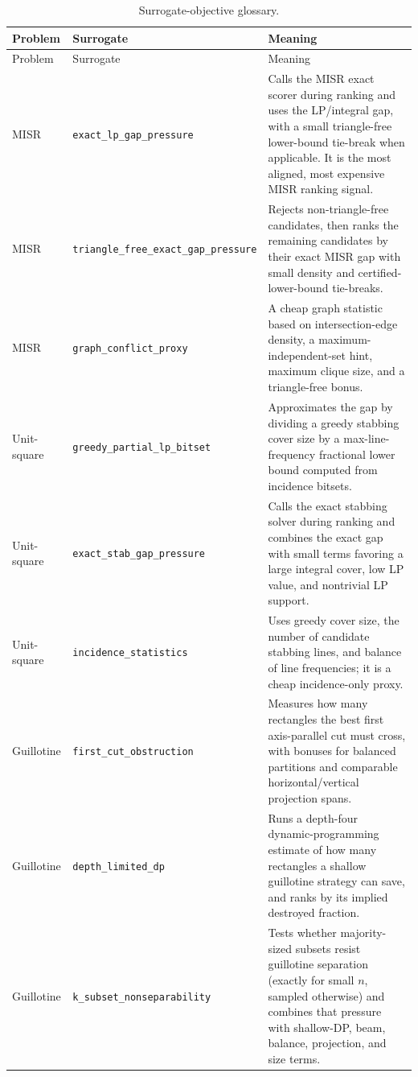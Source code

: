 \documentclass[11pt]{article}
\newcommand{\code}[1]{\texttt{#1}}
\begin{document}
\begin{longtable}{@{}p{}p{}p{}@{}}
\caption{Surrogate-objective glossary.}\label{tab:surrogate-glossary}\\
\toprule
Problem & Surrogate & Meaning \\
\midrule
\endfirsthead
\toprule
Problem & Surrogate & Meaning \\
\midrule
\endhead
\bottomrule
\endfoot
MISR & \code{exact\_lp\_gap\_pressure} & Calls the MISR exact scorer during
ranking and uses the LP/integral gap, with a small triangle-free lower-bound
tie-break when applicable.  It is the most aligned, most expensive MISR
ranking signal. \\
MISR & \code{triangle\_\allowbreak{}free\_\allowbreak{}exact\_\allowbreak{}gap\_\allowbreak{}pressure} & Rejects non-triangle-free
candidates, then ranks the remaining candidates by their exact MISR gap with
small density and certified-lower-bound tie-breaks. \\
MISR & \code{graph\_conflict\_proxy} & A cheap graph statistic based on
intersection-edge density, a maximum-independent-set hint, maximum clique
size, and a triangle-free bonus. \\
\addlinespace
Unit-square & \code{greedy\_partial\_lp\_bitset} & Approximates the gap by
dividing a greedy stabbing cover size by a max-line-frequency fractional lower
bound computed from incidence bitsets. \\
Unit-square & \code{exact\_stab\_gap\_pressure} & Calls the exact stabbing
solver during ranking and combines the exact gap with small terms favoring a
large integral cover, low LP value, and nontrivial LP support. \\
Unit-square & \code{incidence\_statistics} & Uses greedy cover size, the
number of candidate stabbing lines, and balance of line frequencies; it is a
cheap incidence-only proxy. \\
\addlinespace
Guillotine & \code{first\_cut\_obstruction} & Measures how many rectangles the
best first axis-parallel cut must cross, with bonuses for balanced partitions
and comparable horizontal/vertical projection spans. \\
Guillotine & \code{depth\_limited\_dp} & Runs a depth-four dynamic-programming
estimate of how many rectangles a shallow guillotine strategy can save, and
ranks by its implied destroyed fraction. \\
Guillotine & \code{k\_\allowbreak{}subset\_\allowbreak{}nonseparability} & Tests whether majority-sized
subsets resist guillotine separation (exactly for small $n$, sampled otherwise)
and combines that pressure with shallow-DP, beam, balance, projection, and
size terms. \\
\end{longtable}
\normalsize
\end{document}
